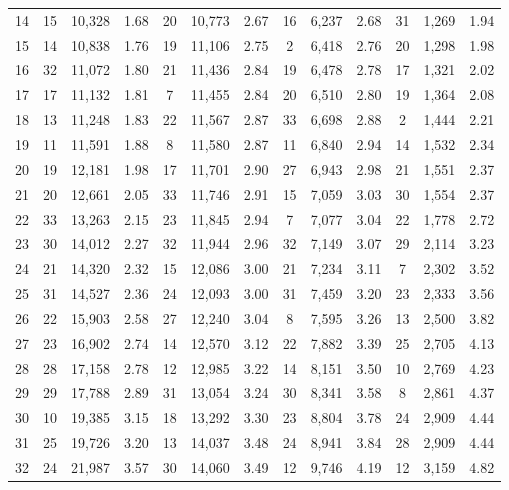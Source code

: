 \begin{table}[H]
{\begin{tabular}{c c c c c c c c c c c c c}
       14 & 15  & 10,328 &  1.68 & 20  & 10,773 &  2.67 & 16  & 6,237 &  2.68 & 31  & 1,269 &  1.94 \\ 
       15 & 14  & 10,838 &  1.76 & 19  & 11,106 &  2.75 & 2  & 6,418 &  2.76 & 20  & 1,298 &  1.98 \\ 
       16 & 32  & 11,072 &  1.80 & 21  & 11,436 &  2.84 & 19  & 6,478 &  2.78 & 17  & 1,321 &  2.02 \\ 
       17 & 17  & 11,132 &  1.81 & 7  & 11,455 &  2.84 & 20  & 6,510 &  2.80 & 19  & 1,364 &  2.08 \\ 
       18 & 13  & 11,248 &  1.83 & 22  & 11,567 &  2.87 & 33  & 6,698 &  2.88 & 2  & 1,444 &  2.21 \\ 
       19 & 11  & 11,591 &  1.88 & 8  & 11,580 &  2.87 & 11  & 6,840 &  2.94 & 14  & 1,532 &  2.34 \\ 
       20 & 19  & 12,181 &  1.98 & 17  & 11,701 &  2.90 & 27  & 6,943 &  2.98 & 21  & 1,551 &  2.37 \\ 
       21 & 20  & 12,661 &  2.05 & 33  & 11,746 &  2.91 & 15  & 7,059 &  3.03 & 30  & 1,554 &  2.37 \\ 
       22 & 33  & 13,263 &  2.15 & 23  & 11,845 &  2.94 & 7  & 7,077 &  3.04 & 22  & 1,778 &  2.72 \\ 
       23 & 30  & 14,012 &  2.27 & 32  & 11,944 &  2.96 & 32  & 7,149 &  3.07 & 29  & 2,114 &  3.23 \\ 
       24 & 21  & 14,320 &  2.32 & 15  & 12,086 &  3.00 & 21  & 7,234 &  3.11 & 7  & 2,302 &  3.52 \\ 
       25 & 31  & 14,527 &  2.36 & 24  & 12,093 &  3.00 & 31  & 7,459 &  3.20 & 23  & 2,333 &  3.56 \\ 
       26 & 22  & 15,903 &  2.58 & 27  & 12,240 &  3.04 & 8  & 7,595 &  3.26 & 13  & 2,500 &  3.82 \\ 
       27 & 23  & 16,902 &  2.74 & 14  & 12,570 &  3.12 & 22  & 7,882 &  3.39 & 25  & 2,705 &  4.13 \\ 
       28 & 28  & 17,158 &  2.78 & 12  & 12,985 &  3.22 & 14  & 8,151 &  3.50 & 10  & 2,769 &  4.23 \\ 
       29 & 29  & 17,788 &  2.89 & 31  & 13,054 &  3.24 & 30  & 8,341 &  3.58 & 8  & 2,861 &  4.37 \\ 
       30 & 10  & 19,385 &  3.15 & 18  & 13,292 &  3.30 & 23  & 8,804 &  3.78 & 24  & 2,909 &  4.44 \\ 
       31 & 25  & 19,726 &  3.20 & 13  & 14,037 &  3.48 & 24  & 8,941 &  3.84 & 28  & 2,909 &  4.44 \\ 
       32 & 24  & 21,987 &  3.57 & 30  & 14,060 &  3.49 & 12  & 9,746 &  4.19 & 12  & 3,159 &  4.82 \\ 

\end{tabular}}
\end{table}
